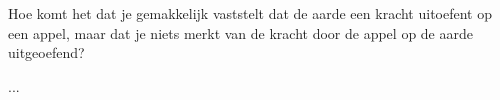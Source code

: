

\item{}Hoe komt het dat je gemakkelijk vaststelt dat de aarde een kracht uitoefent op een appel, maar dat je niets merkt van de kracht door de appel op de aarde uitgeoefend?


\begin{oplossing}
...
\end{oplossing}